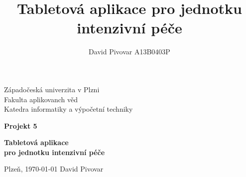 \documentclass[12pt, a4paper]{report}
\title{Tabletová aplikace pro jednotku intenzivní péče}
\author{David Pivovar A13B0403P}
\begin{document}
\begin{titlepage}

\begin{center}
	
	{\fontsize{22}{} \selectfont
		Západočeská univerzita v Plzni\\
		Fakulta aplikovanch věd\\
		Katedra informatiky a výpočetní techniky\\
	}
	
	\vfill
	\vfill
	
	{\fontsize{28}{} \textbf{
		Projekt 5\\
	}}
	
	\vfill
	
	{\fontsize{36}{} \textbf{
		Tabletová aplikace\\pro jednotku intenzivní péče
	}}

\end{center}

\vfill
\vfill
\vfill
\vfill

\begin{flushleft}

	{\fontsize{16}{} \selectfont
		Plzeň, \today
		\hfill
		David Pivovar
	}
	
\end{flushleft}

\end{titlepage}


\tableofcontents





%
%
%


\end{document}
